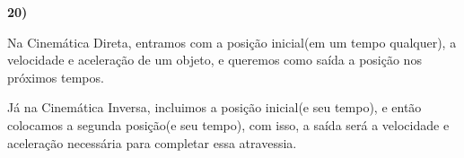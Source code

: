 \textbf{20)} 

Na Cinemática Direta, entramos com a posição inicial(em um tempo qualquer), a 
velocidade e aceleração de um objeto, e queremos como saída 
a posição nos próximos tempos.

Já na Cinemática Inversa, incluimos a posição inicial(e seu tempo),
e então colocamos a segunda posição(e seu tempo), com isso, a saída 
será a velocidade e aceleração necessária para completar essa atravessia.



